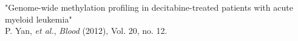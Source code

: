 "Genome-wide methylation profiling in decitabine-treated patients with acute myeloid leukemia" \\
\small{P. Yan, \textit{et al.}, \textit{Blood} (2012), Vol. 20, no. 12.} \\
